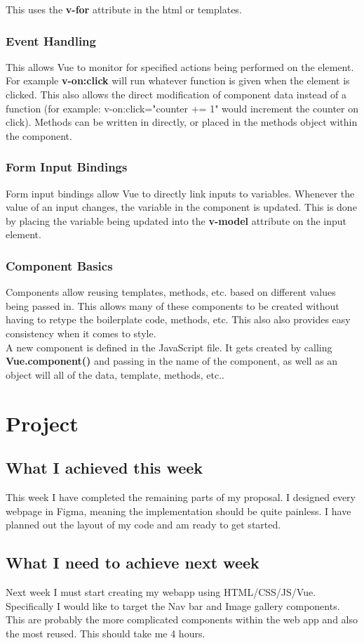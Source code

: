\documentclass[portfolio.tex]{subfiles}
\begin{document}
					\noindent This uses the \textbf{v-for} attribute in the html or templates. \autocite{vue-list}

				\subsubsection{Event Handling}
					This allows Vue to monitor for specified actions being performed on the element. For example \textbf{v-on:click} will run whatever function is given when the element is clicked. This also allows the direct modification of component data instead of a function (for example: v-on:click="counter += 1" would increment the counter on click). Methods can be written in directly, or placed in the methods object within the component. \autocite{vue-event}

				\subsubsection{Form Input Bindings}
					Form input bindings allow Vue to directly link inputs to variables. Whenever the value of an input changes, the variable in the component is updated. This is done by placing the variable being updated into the \textbf{v-model} attribute on the input element. \autocite{vue-list}
				\subsubsection{Component Basics}
					Components allow reusing templates, methods, etc. based on different values being passed in. This allows many of these components to be created without having to retype the boilerplate code, methods, etc. This also also provides easy consistency when it comes to style. \\

					A new component is defined in the JavaScript file. It gets created by calling \textbf{Vue.component()} and passing in the name of the component, as well as an object will all of the data, template, methods, etc.. \autocite{vue-component}


		\section{Project}
			\subsection{What I achieved this week}
				This week I have completed the remaining parts of my proposal. I designed every webpage in Figma, meaning the implementation should be quite painless. I have planned out the layout of my code and am ready to get started.

			\subsection{What I need to achieve next week}
				Next week I must start creating my webapp using HTML/CSS/JS/Vue. Specifically I would like to target the Nav bar and Image gallery components. This are probably the more complicated components within the web app and also the most reused. This should take me 4 hours.


\pagebreak
\end{document}

